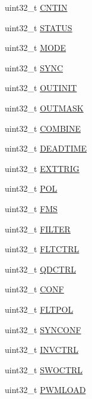 \begin{DoxyCompactItemize}
\begin{tabbing}
\end{tabbing}\item 
uint32\+\_\+t \hyperlink{struct_f_t_m___mem_map_a8b0075986e58bcb446db27764e369135}{C\+N\+T\+I\+N}
\item 
uint32\+\_\+t \hyperlink{struct_f_t_m___mem_map_a9d49382f07b934530245cb8f578e117f}{S\+T\+A\+T\+U\+S}
\item 
uint32\+\_\+t \hyperlink{struct_f_t_m___mem_map_a1cabc42a484f2abbd67af1345b90fcc4}{M\+O\+D\+E}
\item 
uint32\+\_\+t \hyperlink{struct_f_t_m___mem_map_a9537a55fae48de4811bfe7600d37b230}{S\+Y\+N\+C}
\item 
uint32\+\_\+t \hyperlink{struct_f_t_m___mem_map_aacdd40604d98720d58618c5e9f0fb0fd}{O\+U\+T\+I\+N\+I\+T}
\item 
uint32\+\_\+t \hyperlink{struct_f_t_m___mem_map_a16b10477073d1a3822d96ea9f65752fe}{O\+U\+T\+M\+A\+S\+K}
\item 
uint32\+\_\+t \hyperlink{struct_f_t_m___mem_map_ab00737276f6086e805d6d7c892608100}{C\+O\+M\+B\+I\+N\+E}
\item 
uint32\+\_\+t \hyperlink{struct_f_t_m___mem_map_a7a7e6e572834de5c95fc5279659e582c}{D\+E\+A\+D\+T\+I\+M\+E}
\item 
uint32\+\_\+t \hyperlink{struct_f_t_m___mem_map_afe00dccf260f10c5172a9cae5fb72d69}{E\+X\+T\+T\+R\+I\+G}
\item 
uint32\+\_\+t \hyperlink{struct_f_t_m___mem_map_a3a9de308929bca0a0a9155f4222aadae}{P\+O\+L}
\item 
uint32\+\_\+t \hyperlink{struct_f_t_m___mem_map_a7240bf4b5ae452ac8b2beb8c6f26833c}{F\+M\+S}
\item 
uint32\+\_\+t \hyperlink{struct_f_t_m___mem_map_af3c88a62b68d6b62793ce078ae72d31b}{F\+I\+L\+T\+E\+R}
\item 
uint32\+\_\+t \hyperlink{struct_f_t_m___mem_map_ab04c5a66d20efe200fa625cbb15ab678}{F\+L\+T\+C\+T\+R\+L}
\item 
uint32\+\_\+t \hyperlink{struct_f_t_m___mem_map_a88687af53ea301e8e0c793d8539dd4dd}{Q\+D\+C\+T\+R\+L}
\item 
uint32\+\_\+t \hyperlink{struct_f_t_m___mem_map_a7b48a7fbd1a47ba72e009b9d82b89cf6}{C\+O\+N\+F}
\item 
uint32\+\_\+t \hyperlink{struct_f_t_m___mem_map_a0ed846091be8a3e998d93d2bc45f78dd}{F\+L\+T\+P\+O\+L}
\item 
uint32\+\_\+t \hyperlink{struct_f_t_m___mem_map_a3bd4b174127a80c7f8bd910b66e6de60}{S\+Y\+N\+C\+O\+N\+F}
\item 
uint32\+\_\+t \hyperlink{struct_f_t_m___mem_map_afd87045c28b90c41492f23d268554433}{I\+N\+V\+C\+T\+R\+L}
\item 
uint32\+\_\+t \hyperlink{struct_f_t_m___mem_map_afb4481ebbb2867c1bc009d6b73ad661e}{S\+W\+O\+C\+T\+R\+L}
\item 
uint32\+\_\+t \hyperlink{struct_f_t_m___mem_map_a84f64d9ce40acaa01380dab13bc5b5ea}{P\+W\+M\+L\+O\+A\+D}
\end{DoxyCompactItemize}


